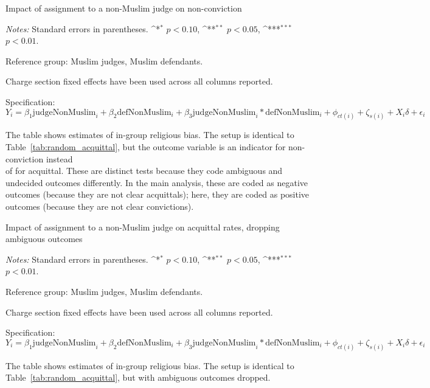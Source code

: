 \documentclass[12pt,english]{article}
\def\sym#1{\ifmmode^{#1}\else\(^{#1}\)\fi}
\newcommand{\HOME}{\string~}
\newcommand{\curpath}{\HOME/ddl/justice-overleaf}
\newcommand{\curpath}{.}
\begin{document}
\begin{appendices}
\begin{landscape}
\begin{table}
  \begin{center}
     \caption{Impact of assignment to a non-Muslim judge on non-conviction}
      \label{tab:app_random_muslim}
     
    \end{center}
    \begin{minipage}{1.5\textwidth}
        \footnotesize 
        \emph{Notes:} Standard errors in parentheses. \sym{*} \(p<0.10\), \sym{**} \(p<0.05\), \sym{***} \(p<0.01\).  \par 
        Reference group: Muslim judges, Muslim defendants.  \par
        Charge section fixed effects have been used across all columns reported. \par
        Specification: $Y_{i} = \beta_{1} \text{judgeNonMuslim}_{i} + \beta_{2} \text{defNonMuslim}_{i} + \beta_{3} \text{judgeNonMuslim}_{i} * \text{defNonMuslim}_{i} + \phi_{ct(i)} + \zeta_{s(i)} + X_i \delta + \epsilon_{i}$  \par
        The table shows estimates of in-group religious bias. The setup is identical to Table~\ref{tab:random_acquittal}, but the outcome variable is an indicator for non-conviction instead \\ of for acquittal. These are distinct tests because they code ambiguous and undecided outcomes differently. In the main analysis, these are coded as negative outcomes (because they are not clear acquittals); here, they are coded as positive outcomes (because they are not clear convictions).
   \end{minipage}
\end{table}


\begin{table}
  \begin{center}
     \caption{Impact of assignment to a non-Muslim judge on acquittal rates,  dropping ambiguous outcomes}
      \label{tab:amb_random_muslim}
     
    \end{center}
    \begin{minipage}{1.6\textwidth}
        \footnotesize 
        \emph{Notes:} Standard errors in parentheses. \sym{*} \(p<0.10\), \sym{**} \(p<0.05\), \sym{***} \(p<0.01\).  \par 
        Reference group: Muslim judges, Muslim defendants.  \par
        Charge section fixed effects have been used across all columns reported. \par
        Specification: $Y_{i} = \beta_{1} \text{judgeNonMuslim}_{i} + \beta_{2} \text{defNonMuslim}_{i} + \beta_{3} \text{judgeNonMuslim}_{i} * \text{defNonMuslim}_{i} + \phi_{ct(i)} + \zeta_{s(i)} + X_i \delta + \epsilon_{i}$  \par
        The table shows estimates of in-group religious bias. The setup is identical to Table~\ref{tab:random_acquittal}, but with ambiguous outcomes dropped.
   \end{minipage}
\end{table}





\end{landscape}
\end{appendices}
\end{document}
